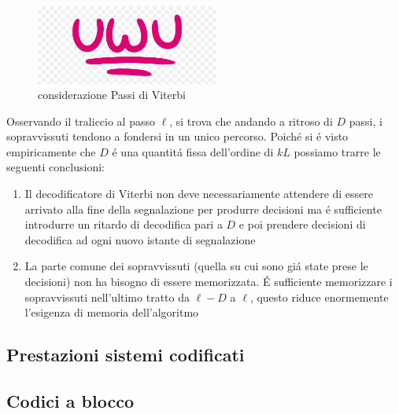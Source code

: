                 \begin{figure}[H]
                    \centering
                    \includegraphics[width = 6cm]{media/uwu.png}
                    \caption{considerazione Passi di Viterbi}
                \end{figure}
                Osservando il traliccio al passo $\ell$, si trova che andando a ritroso di $D$ passi, i sopravvissuti
                tendono a fondersi in un unico percorso. Poiché si é visto empiricamente che $D$ é una quantitá fissa
                dell'ordine di $kL$ possiamo trarre le seguenti conclusioni:
                \begin{enumerate}
                    \item {Il decodificatore di Viterbi non deve necessariamente attendere di essere arrivato
                        alla fine della segnalazione per produrre decisioni ma é sufficiente introdurre un ritardo di decodifica
                        pari a $D$ e poi prendere decisioni di decodifica ad ogni nuovo istante di segnalazione   
                    }
                    \item {La parte comune dei sopravvissuti (quella su cui sono giá state prese le decisioni)
                        non ha bisogno di essere memorizzata. É sufficiente memorizzare i sopravvissuti nell'ultimo tratto da 
                        $\ell -D$ a $\ell$, questo riduce enormemente l'esigenza di memoria dell'algoritmo
                    }
                \end{enumerate}
    \subsection{Prestazioni sistemi codificati}
        \subsection{Codici a blocco}
